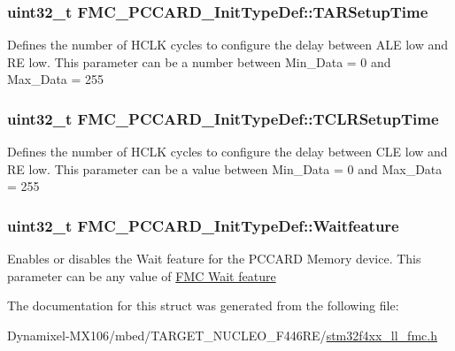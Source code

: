 \subsubsection[{\texorpdfstring{T\+A\+R\+Setup\+Time}{TARSetupTime}}]{\setlength{\rightskip}{0pt plus 5cm}uint32\+\_\+t F\+M\+C\+\_\+\+P\+C\+C\+A\+R\+D\+\_\+\+Init\+Type\+Def\+::\+T\+A\+R\+Setup\+Time}\hypertarget{struct_f_m_c___p_c_c_a_r_d___init_type_def_a146ea5d7f4dadc6745c0f14069b02b25}{}\label{struct_f_m_c___p_c_c_a_r_d___init_type_def_a146ea5d7f4dadc6745c0f14069b02b25}
Defines the number of H\+C\+LK cycles to configure the delay between A\+LE low and RE low. This parameter can be a number between Min\+\_\+\+Data = 0 and Max\+\_\+\+Data = 255 
\subsubsection[{\texorpdfstring{T\+C\+L\+R\+Setup\+Time}{TCLRSetupTime}}]{\setlength{\rightskip}{0pt plus 5cm}uint32\+\_\+t F\+M\+C\+\_\+\+P\+C\+C\+A\+R\+D\+\_\+\+Init\+Type\+Def\+::\+T\+C\+L\+R\+Setup\+Time}\hypertarget{struct_f_m_c___p_c_c_a_r_d___init_type_def_a5cea83326b45ca6f2efdd906d47b9253}{}\label{struct_f_m_c___p_c_c_a_r_d___init_type_def_a5cea83326b45ca6f2efdd906d47b9253}
Defines the number of H\+C\+LK cycles to configure the delay between C\+LE low and RE low. This parameter can be a value between Min\+\_\+\+Data = 0 and Max\+\_\+\+Data = 255 
\subsubsection[{\texorpdfstring{Waitfeature}{Waitfeature}}]{\setlength{\rightskip}{0pt plus 5cm}uint32\+\_\+t F\+M\+C\+\_\+\+P\+C\+C\+A\+R\+D\+\_\+\+Init\+Type\+Def\+::\+Waitfeature}\hypertarget{struct_f_m_c___p_c_c_a_r_d___init_type_def_a84d52bc62cc1cf37523fe42418bdb159}{}\label{struct_f_m_c___p_c_c_a_r_d___init_type_def_a84d52bc62cc1cf37523fe42418bdb159}
Enables or disables the Wait feature for the P\+C\+C\+A\+RD Memory device. This parameter can be any value of \hyperlink{group___f_m_c___wait__feature}{F\+MC Wait feature} 

The documentation for this struct was generated from the following file\+:\begin{DoxyCompactItemize}
\item 
Dynamixel-\/\+M\+X106/mbed/\+T\+A\+R\+G\+E\+T\+\_\+\+N\+U\+C\+L\+E\+O\+\_\+\+F446\+R\+E/\hyperlink{stm32f4xx__ll__fmc_8h}{stm32f4xx\+\_\+ll\+\_\+fmc.\+h}\end{DoxyCompactItemize}
